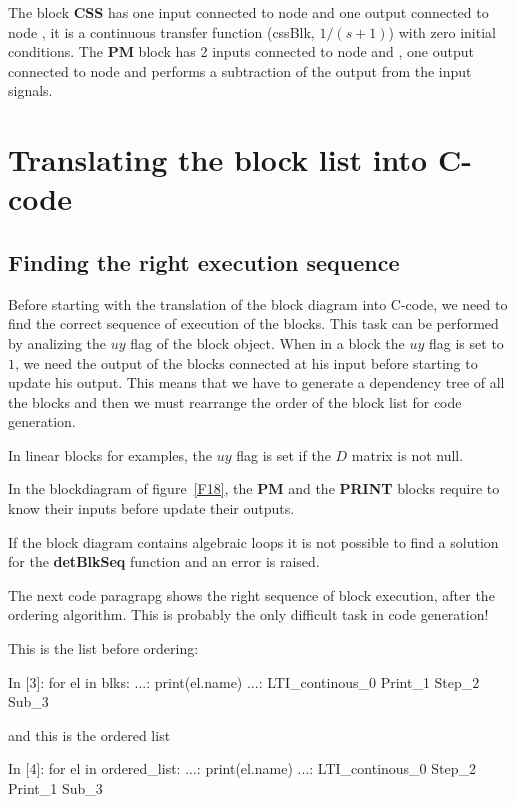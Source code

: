 The block \textbf{CSS} has one input connected to node  and 
one output connected to node , it is a continuous transfer function 
(cssBlk, $1/(s+1)$) with zero initial conditions. The \textbf{PM} block has 
2 inputs connected to node  and , one output 
connected to node  and performs a subtraction of the output from the 
input signals.

\section{Translating the block list into C-code}
\subsection{Finding the right execution sequence}
Before starting with the translation of the block diagram into C-code, we need 
to find the correct sequence of execution of the blocks. This task can be 
performed by analizing the $uy$ flag of the block object. 
When in a block the $uy$ flag is set to $1$, we need the output of the blocks 
connected at his input before starting to update his output.
This means that we have to generate a dependency tree of all the blocks and 
then we must rearrange the order of the block list for code generation.

In linear blocks for examples, the $uy$ flag is set if the $D$ matrix is not 
null.

In the blockdiagram of figure~\ref{F18}, the \textbf{PM} and the 
\textbf{PRINT} blocks require to know their inputs before update their outputs.

If the block diagram contains algebraic loops it is not possible to find a solution for the \textbf{detBlkSeq} function and an error is raised.

The next code paragrapg shows the right sequence of block execution, after the ordering algorithm. This is probably the only difficult task in code generation!

This is the list before ordering:

\begin{code}
In [3]: for el in blks:
   ...:     print(el.name)
   ...:
LTI_continous_0
Print_1
Step_2
Sub_3
\end{code}

and this is the ordered list

\begin{code}
In [4]: for el in ordered_list:
   ...:     print(el.name)
   ...:
LTI_continous_0
Step_2
Print_1
Sub_3
\end{code}

